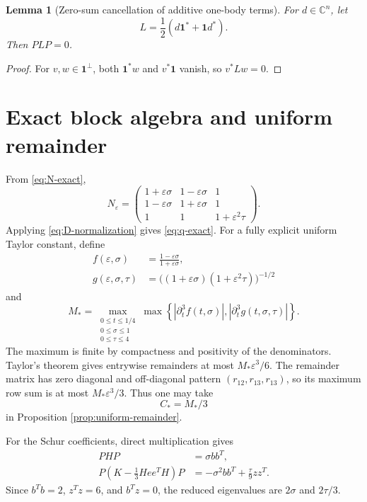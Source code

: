 \documentclass[11pt]{article}
\newtheorem{lemma}[theorem]{Lemma}
\newcommand{\one}{\mathbf 1}
\newcommand{\C}{\mathbb C}
\newcommand{\eps}{\varepsilon}
\begin{document}
\begin{lemma}[Zero-sum cancellation of additive one-body terms]
For $d\in\C^n$, let
\[
  L=\frac12(d\one^*+\one d^*).
\]
Then $PLP=0$.
\end{lemma}

\begin{proof}
For $v,w\in\one^\perp$, both $\one^*w$ and $v^*\one$ vanish, so $v^*Lw=0$.
\end{proof}

\section{Exact block algebra and uniform remainder}
\label{app:uniform-remainder}

From \eqref{eq:N-exact},
\[
  N_\eps=
  \begin{pmatrix}
  1+\eps\sigma&1-\eps\sigma&1\\
  1-\eps\sigma&1+\eps\sigma&1\\
  1&1&1+\eps^2\tau
  \end{pmatrix}.
\]
Applying \eqref{eq:D-normalization} gives \eqref{eq:q-exact}.  For a fully explicit uniform Taylor constant, define
\begin{align*}
  f(\eps,\sigma)&=\frac{1-\eps\sigma}{1+\eps\sigma},\\
  g(\eps,\sigma,\tau)&=\bigl((1+\eps\sigma)(1+\eps^2\tau)\bigr)^{-1/2}
\end{align*}
and
\begin{equation}
  M_*
  =\max_{\substack{0\le t\le1/4\\0\le\sigma\le1\\0\le\tau\le4}}
  \max\left\{
  |\partial_t^3f(t,\sigma)|,
  |\partial_t^3g(t,\sigma,\tau)|
  \right\}.
  \label{eq:M-star}
\end{equation}
The maximum is finite by compactness and positivity of the denominators.  Taylor's theorem gives entrywise remainders at most $M_*\eps^3/6$.  The remainder matrix has zero diagonal and off-diagonal pattern $(r_{12},r_{13},r_{13})$, so its maximum row sum is at most $M_*\eps^3/3$.  Thus one may take
\begin{equation}
  C_*=M_*/3
  \label{eq:C-star}
\end{equation}
in Proposition \ref{prop:uniform-remainder}.

For the Schur coefficients, direct multiplication gives
\begin{align*}
  PHP&=\sigma bb^T,\\
  P\left(K-\frac13Hee^TH\right)P
  &=-\sigma^2bb^T+\frac{\tau}{9}zz^T.
\end{align*}
Since $b^Tb=2$, $z^Tz=6$, and $b^Tz=0$, the reduced eigenvalues are $2\sigma$ and $2\tau/3$.
\end{document}
